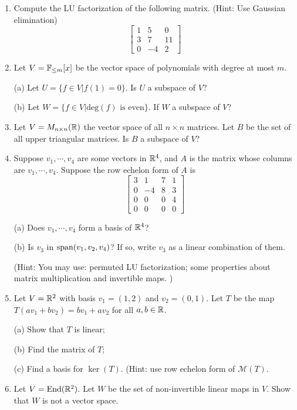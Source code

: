 \documentclass{amsart}
\begin{document}
	
\vspace{2em}

\begin{enumerate}
\item Compute the LU factorization of the following matrix. (Hint: Use Gaussian elimination)
\[\begin{bmatrix}
	1&5&0\\3&7&11\\0&-4&2
\end{bmatrix}\]
\item Let $V=\mathbb{F}_{\leq m}[x]$ be the vector space of polynomials with degree at most $m$. 

(a) Let $U=\{f\in V|f(1)=0\}$. Is $U$ a subspace of $V$?

(b) Let $W=\{f\in V| \text{deg}(f)\text{ is even}\}$. If $W$ a subspace of $V$?
\item Let $V=M_{n\times n}(\mathbb{R})$ the vector space of all $n\times n$ matrices. Let $B$ be the set of all upper triangular matrices. Is $B$ a subspace of $V$?
\item Suppose $v_1,\cdots,v_4$ are some vectors in $\mathbb{R}^4$, and $A$ is the matrix whose columns are $v_1,\cdots,v_4$. Suppose the row echelon form of $A$ is
\[\begin{bmatrix}
	3&1&7&1\\0&-4&8&3\\0&0&0&4\\0&0&0&0
\end{bmatrix}\]

(a) Does $v_1,\cdots,v_4$ form a basis of $\mathbb{R}^4$?

(b) Is $v_3$ in $\operatorname{span}(v_1,v_2,v_4)$? If so, write $v_3$ as a linear combination of them.

(Hint: You may use: permuted LU factorization; some properties about matrix multiplication and invertible maps. )
\item Let $V=\mathbb{R}^2$ with basis $v_1 = (1,2)$ and $v_2= (0,1)$. Let $T$ be the map $T(a v_1 +b v_2)=bv_1 + av_2$ for all $a,b\in\mathbb{R}$.

(a) Show that $T$ is linear;

(b) Find the matrix of $T$;

(c) Find a basis for $\ker(T)$. (Hint: use row echelon form of $\mathcal{M}(T)$. 
\item Let $V=\text{End}({\mathbb{R}^2})$. Let $W$ be the set of non-invertible linear maps in $V$. Show that $W$ is not a vector space.


\end{enumerate}
\end{document}

